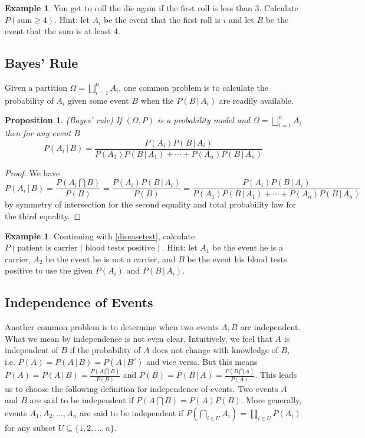 \documentclass[12pt]{amsart}
\newtheorem{proposition}[theorem]{Proposition}
\theoremstyle{definition}
\newtheorem{example}[theorem]{Example}
\begin{document}
\begin{example}You get to roll the die again if the first roll is less than 3. Calculate $P(\text{sum} \geq 4)$. Hint: let $A_i$ be the event that the first roll is $i$ and let $B$ be the event that the sum is at least 4.
\end{example}

\subsection{Bayes' Rule} Given a partition $\Omega = \bigsqcup\limits_{i=1}^n A_i$, one common problem is to calculate the probability of $A_i$ given some event $B$ when the $P(B \,|\, A_i)$ are readily available.

\begin{proposition} (Bayes' rule) If $(\Omega, P)$ is a probability model and $\Omega = \bigsqcup\limits_{i=1}^n A_i$ then for any event $B$
$$P(A_i \,|\, B) = \frac{P(A_i)P(B \,|\, A_i)}{P(A_1)P(B \,|\, A_1) + \cdots + P(A_n)P(B \,|\, A_n)}$$
\end{proposition}
\begin{proof} We have
$$P(A_i \,|\, B) = \frac{P(A_i \bigcap B)}{P(B)} = \frac{P(A_i)P(B \,|\, A_i)}{P(B)} = \frac{P(A_i)P(B \,|\, A_i)}{P(A_1)P(B \,|\, A_1) + \cdots + P(A_n)P(B \,|\, A_n)}$$
by symmetry of intersection for the second equality and total probability law for the third equality.
\end{proof}

\begin{example} \label{diseasetest1} Continuing with \ref{diseasetest}, calculate $P(\text{patient is carrier } | \text{ blood tests positive})$. Hint: let $A_1$ be the event he is a carrier, $A_2$ be the event he is not a carrier, and $B$ be the event his blood tests positive to use the given $P(A_i)$ and $P(B \,|\, A_i)$. 
\end{example}

\subsection{Independence of Events} Another common problem is to determine when two events $A, B$ are independent. What we mean by independence is not even clear. Intuitively, we feel that $A$ is independent of $B$ if the probability of $A$ does not change with knowledge of $B$, i.e. $P(A) = P(A \,|\, B) = P(A \,|\, B^c)$ and vice versa. But this means $P(A) = P(A \,|\, B) = \frac{P(A \bigcap B)}{P(B)}$ and $P(B) = P(B \,|\, A) = \frac{P(B \bigcap A)}{P(A)}$. This leads us to choose the following definition for independence of events.
\dfn\label{independentevents} Two events $A$ and $B$ are said to be independent if $P(A \bigcap B) = P(A)P(B)$. More generally, events $A_1, A_2, \dots , A_n$ are said to be independent if $P(\bigcap\limits_{i \in U} A_i)= \prod\limits_{i \in U} P(A_i)$ for any subset $U \subseteq \{1,2, \dots ,n\}$.
\end{document}
